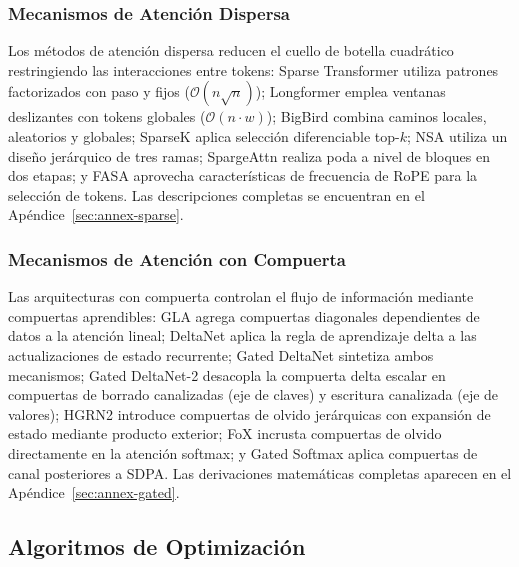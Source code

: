 \subsubsection{Mecanismos de Atención Dispersa}
Los métodos de atención dispersa reducen el cuello de botella cuadrático restringiendo las interacciones entre tokens: Sparse Transformer \citep{child_sparse_transformer_2019} utiliza patrones factorizados con paso y fijos ($\mathcal{O}(n\sqrt{n})$); Longformer \citep{beltagy_longformer_2020} emplea ventanas deslizantes con tokens globales ($\mathcal{O}(n \cdot w)$); BigBird \citep{zaheer_bigbird_2020} combina caminos locales, aleatorios y globales; SparseK \citep{lou_sparsek_2024} aplica selección diferenciable top-$k$; NSA \citep{yuan_nsa_2025} utiliza un diseño jerárquico de tres ramas; SpargeAttn \citep{zhang_spargeattn_2025} realiza poda a nivel de bloques en dos etapas; y FASA \citep{wang_fasa_2026} aprovecha características de frecuencia de RoPE para la selección de tokens. Las descripciones completas se encuentran en el Apéndice~\ref{sec:annex-sparse}.

\subsubsection{Mecanismos de Atención con Compuerta}
Las arquitecturas con compuerta controlan el flujo de información mediante compuertas aprendibles: GLA \citep{yang_gla_2023} agrega compuertas diagonales dependientes de datos a la atención lineal; DeltaNet \citep{yang_deltanet_2024} aplica la regla de aprendizaje delta a las actualizaciones de estado recurrente; Gated DeltaNet \citep{yang_gated_deltanet_2024} sintetiza ambos mecanismos; Gated DeltaNet-2 \citep{hatamizadeh_gated_deltanet2_2026} desacopla la compuerta delta escalar en compuertas de borrado canalizadas (eje de claves) y escritura canalizada (eje de valores); HGRN2 \citep{qin_hgrn2_2024} introduce compuertas de olvido jerárquicas con expansión de estado mediante producto exterior; FoX \citep{lin_forgetting_transformer_2025} incrusta compuertas de olvido directamente en la atención softmax; y Gated Softmax \citep{qiu_gated_attention_2025} aplica compuertas de canal posteriores a SDPA. Las derivaciones matemáticas completas aparecen en el Apéndice~\ref{sec:annex-gated}.

\subsection{Algoritmos de Optimización}

